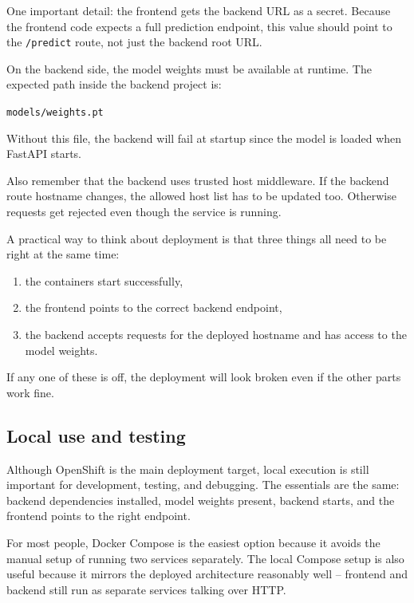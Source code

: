 \documentclass{article}
\begin{document}
One important detail: the frontend gets the backend URL as a secret. Because the frontend code expects a full prediction endpoint, this value should point to the \texttt{/predict} route, not just the backend root URL.

On the backend side, the model weights must be available at runtime. The expected path inside the backend project is:

\begin{center}
\texttt{models/weights.pt}
\end{center}

Without this file, the backend will fail at startup since the model is loaded when FastAPI starts.

Also remember that the backend uses trusted host middleware. If the backend route hostname changes, the allowed host list has to be updated too. Otherwise requests get rejected even though the service is running.

A practical way to think about deployment is that three things all need to be right at the same time:

\begin{enumerate}
    \item the containers start successfully,
    \item the frontend points to the correct backend endpoint,
    \item the backend accepts requests for the deployed hostname and has access to the model weights.
\end{enumerate}

If any one of these is off, the deployment will look broken even if the other parts work fine.

\subsection{Local use and testing}

Although OpenShift is the main deployment target, local execution is still important for development, testing, and debugging. The essentials are the same: backend dependencies installed, model weights present, backend starts, and the frontend points to the right endpoint.

For most people, Docker Compose is the easiest option because it avoids the manual setup of running two services separately. The local Compose setup is also useful because it mirrors the deployed architecture reasonably well -- frontend and backend still run as separate services talking over HTTP.
\end{document}
